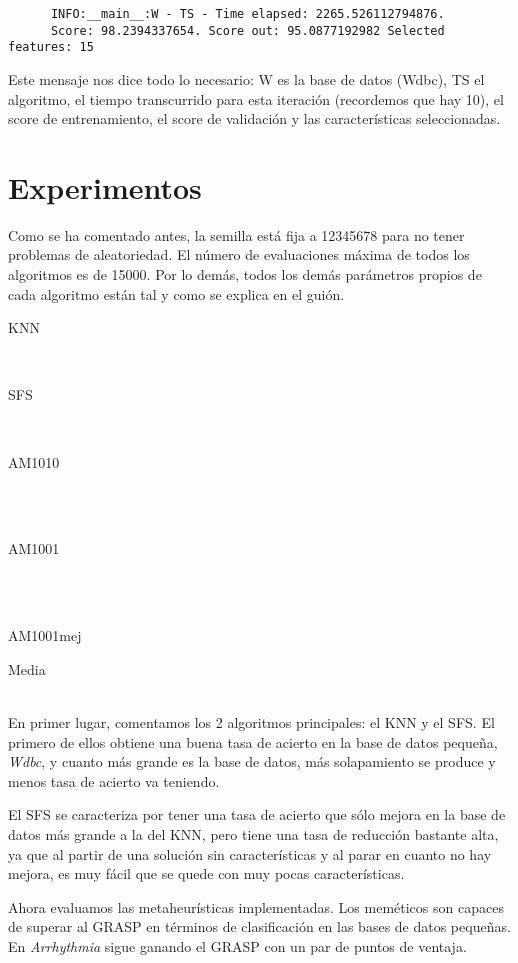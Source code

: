 \documentclass[a4paper, 11pt]{article}
\begin{document}
    \begin{verbatim}
      INFO:__main__:W - TS - Time elapsed: 2265.526112794876.
      Score: 98.2394337654. Score out: 95.0877192982 Selected features: 15
    \end{verbatim}

    Este mensaje nos dice todo lo necesario: W es la base de datos (Wdbc), TS el algoritmo, el tiempo transcurrido para esta iteración (recordemos que hay 10), el score de entrenamiento, el score de validación y las características seleccionadas.
  \section{Experimentos}
    Como se ha comentado antes, la semilla está fija a 12345678 para no tener problemas de aleatoriedad. El número de evaluaciones máxima de todos los algoritmos es de 15000. Por lo demás, todos los demás parámetros propios de cada algoritmo están tal y como se explica en el guión. \\

    \newpage

    \centerline{KNN}
    \\
    \centerline{SFS}
    
    \\ \centerline{AM1010}
    \\
    \\ \centerline{AM1001}
    \\
    \\ \centerline{AM1001mej}
    
    \centerline{Media}
    \\

    En primer lugar, comentamos los 2 algoritmos principales: el KNN y el SFS. El primero de ellos obtiene una buena tasa de acierto en la base de datos pequeña, \emph{Wdbc}, y cuanto más grande es la base de datos, más solapamiento se produce y menos tasa de acierto va teniendo.

    El SFS se caracteriza por tener una tasa de acierto que sólo mejora en la base de datos más grande a la del KNN, pero tiene una tasa de reducción bastante alta, ya que al partir de una solución sin características y al parar en cuanto no hay mejora, es muy fácil que se quede con muy pocas características.

    Ahora evaluamos las metaheurísticas implementadas. Los meméticos son capaces de superar al GRASP en términos de clasificación en las bases de datos pequeñas. En \emph{Arrhythmia} sigue ganando el GRASP con un par de puntos de ventaja.
\end{document}
